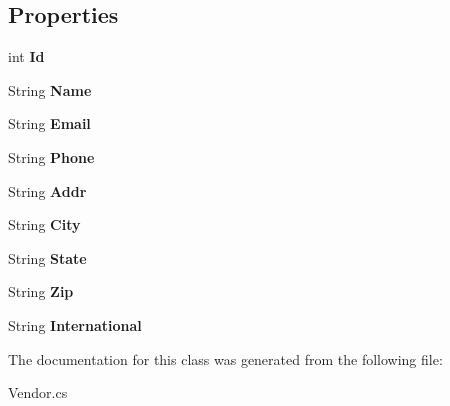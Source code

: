 \subsection*{Properties}
\begin{DoxyCompactItemize}
\item 
\mbox{\label{class_nexus_1_1_vendor_a11f7a2572c887641de1e8bda33a0fe8f}} 
int {\bfseries Id}
\item 
\mbox{\label{class_nexus_1_1_vendor_a72eb8bd6d2f5d13060b4275838a08561}} 
String {\bfseries Name}
\item 
\mbox{\label{class_nexus_1_1_vendor_a1e3842c71c96326fdc2dcfdb3d9f8f91}} 
String {\bfseries Email}
\item 
\mbox{\label{class_nexus_1_1_vendor_a3ae6a61d7132744ff21fc38c8707ea5c}} 
String {\bfseries Phone}
\item 
\mbox{\label{class_nexus_1_1_vendor_a5004e195f8305937da6034eaef584698}} 
String {\bfseries Addr}
\item 
\mbox{\label{class_nexus_1_1_vendor_a18e13471d9057e0dbcde4704eea10922}} 
String {\bfseries City}
\item 
\mbox{\label{class_nexus_1_1_vendor_a31cb5e6e07a7b193c00ef675a88b798e}} 
String {\bfseries State}
\item 
\mbox{\label{class_nexus_1_1_vendor_a3fe26107db73721c00b1b3b61da3e1d7}} 
String {\bfseries Zip}
\item 
\mbox{\label{class_nexus_1_1_vendor_a85f91b23a77b33ddfa8a78566d2efe30}} 
String {\bfseries International}
\end{DoxyCompactItemize}


The documentation for this class was generated from the following file\+:\begin{DoxyCompactItemize}
\item 
Vendor.\+cs\end{DoxyCompactItemize}
